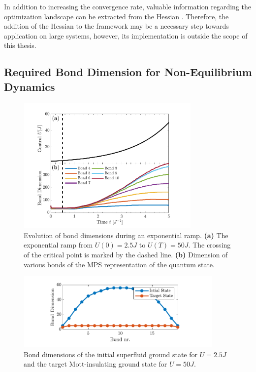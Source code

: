 In addition to increasing the convergence rate, valuable information regarding the optimization landscape can be extracted from the Hessian \cite{Shen2006}. Therefore, the addition of the Hessian to the framework may be a necessary step towards application on large systems, however, its implementation is outside the scope of this thesis.


\subsection{Required Bond Dimension for Non-Equilibrium Dynamics}
\begin{figure}[t!]
    \centering
    \includegraphics[width=0.8\textwidth]{Figures/L20/BondDimEvolution.pdf}
    \caption{ Evolution of bond dimensions during an exponential ramp. \textbf{(a)} The exponential ramp from $U(0) = 2.5 J$ to $U(T) = 50 J$. The crossing of the critical point is marked by the dashed line. \textbf{(b)} Dimension of various bonds of the MPS representation of the quantum state. }
    \label{fig:BondDimEvolution}
\end{figure}
\begin{figure}[t!]
    \centering
    \includegraphics[width=0.9\textwidth]{Figures/L20/InitialBondDim.pdf}
    \caption{ Bond dimensions of the initial superfluid ground state for $U = 2.5 J $ and the target Mott-insulating ground state for $U = 50 J $.}
    \label{fig:InitialBondDim}
\end{figure}

